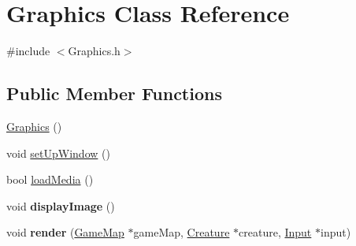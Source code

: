 \hypertarget{class_graphics}{}\section{Graphics Class Reference}
\label{class_graphics}


{\ttfamily \#include $<$Graphics.\+h$>$}

\subsection*{Public Member Functions}
\begin{DoxyCompactItemize}
\item 
\hyperlink{class_graphics_af2e8fe67fd31ec263c843a6e28b29d3c}{Graphics} ()
\item 
void \hyperlink{class_graphics_ac0a2b43dd0353c527174a0cc23665672}{set\+Up\+Window} ()
\item 
bool \hyperlink{class_graphics_afc73b9d97804e153e361353afac1c3ad}{load\+Media} ()
\item 
\hypertarget{class_graphics_a6a3422320eb4d7f1c1d931dcefcd6f5c}{}void {\bfseries display\+Image} ()\label{class_graphics_a6a3422320eb4d7f1c1d931dcefcd6f5c}

\item 
\hypertarget{class_graphics_a8b70dd76aa4fee5d0b38895c718a54b6}{}void {\bfseries render} (\hyperlink{class_game_map}{Game\+Map} $\ast$game\+Map, \hyperlink{class_creature}{Creature} $\ast$creature, \hyperlink{class_input}{Input} $\ast$input)\label{class_graphics_a8b70dd76aa4fee5d0b38895c718a54b6}


\end{DoxyCompactItemize}

